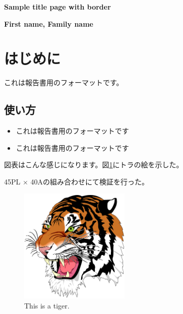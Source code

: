 \documentclass[dvipdfmx, fontsize=12pt]{jlreq}
\newcommand{\登録番号}{TR23-1001094-01}
\begin{document}
\begin{center}
        \vspace*{1cm}

        \huge
        \textbf{Sample title page with border}

        \vspace{2.0cm}
        \LARGE
        \textbf{First name, Family name}

        \vfill
\end{center}
\newpage

\lipsum[1-5]

\newpage

\section{はじめに}
これは報告書用のフォーマットです。

\subsection{使い方}
\begin{itemize}
    \item これは報告書用のフォーマットです
    \item これは報告書用のフォーマットです
\end{itemize}

図表はこんな感じになります。図\ref{tiger}にトラの絵を示した。

45PL $\times$ 40Aの組み合わせにて検証を行った。
\begin{figure}
    \centering
    \includegraphics[keepaspectratio=true,width=0.47\textwidth]{tiger.png}
    \caption{This is a tiger.}
    \label{tiger}
\end{figure}
\end{document}
